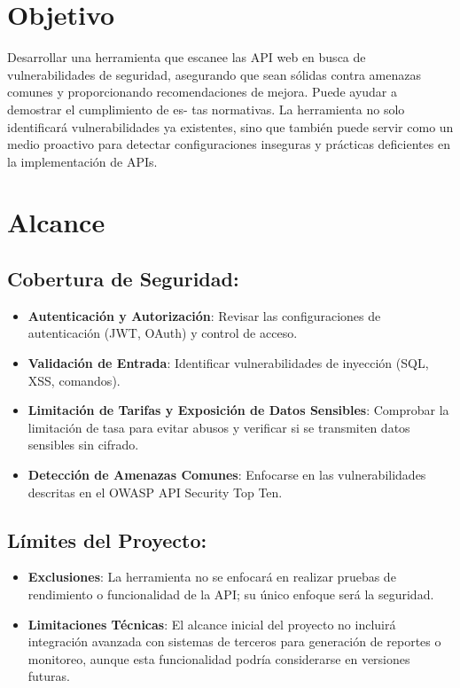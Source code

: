 \documentclass{article}
\begin{document}
	\newpage
    
    \section{Objetivo}

    Desarrollar una herramienta que escanee las API web en busca de vulnerabilidades de seguridad, asegurando que sean sólidas contra amenazas comunes y proporcionando recomendaciones de mejora. Puede ayudar a demostrar el cumplimiento de es- tas normativas. La herramienta no solo identificará vulnerabilidades ya existentes, sino que también puede servir como un medio proactivo para detectar configuraciones inseguras y prácticas deficientes en la implementación de APIs.

    \section{Alcance}

    \subsection{Cobertura de Seguridad:}
    \begin{itemize}
        \item \textbf{Autenticación y Autorización}: Revisar las configuraciones de autenticación (JWT, OAuth) y control de acceso.
        \item \textbf{Validación de Entrada}: Identificar vulnerabilidades de inyección (SQL, XSS, comandos).
        \item \textbf{Limitación de Tarifas y Exposición de Datos Sensibles}: Comprobar la limitación de tasa para evitar abusos y verificar si se transmiten datos sensibles sin cifrado.
        \item \textbf{Detección de Amenazas Comunes}: Enfocarse en las vulnerabilidades descritas en el OWASP API Security Top Ten.
    \end{itemize}

    \subsection{Límites del Proyecto:}
    \begin{itemize}
        \item \textbf{Exclusiones}: La herramienta no se enfocará en realizar pruebas de rendimiento o funcionalidad de la API; su único enfoque será la seguridad.
        \item \textbf{Limitaciones Técnicas}: El alcance inicial del proyecto no incluirá integración avanzada con sistemas de terceros para generación de reportes o monitoreo, aunque esta funcionalidad podría considerarse en versiones futuras.
    \end{itemize}
\end{document}
